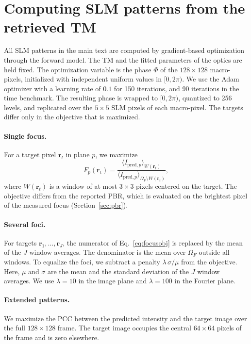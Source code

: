 \documentclass{article}
\begin{document}
\section{Computing SLM patterns from the retrieved TM}
\label{sec:slm}
All SLM patterns in the main text are computed by gradient-based optimization through the forward model.
The TM and the fitted parameters of the optics are held fixed.
The optimization variable is the phase $\Phi$ of the $128\times128$ macro-pixels, initialized with independent uniform values in $[0,2\pi)$.
We use the Adam optimizer with a learning rate of $0.1$ for 150 iterations, and 90 iterations in the time benchmark.
The resulting phase is wrapped to $[0,2\pi)$, quantized to 256 levels, and replicated over the $5\times5$ SLM pixels of each macro-pixel.
The targets differ only in the objective that is maximized.

\paragraph{Single focus.}
For a target pixel $\mathbf{r}_t$ in plane $p$, we maximize
\begin{equation}
\label{eq:focusobj}
F_p(\mathbf{r}_t)=\frac{\langle I_{\mathrm{pred},p}\rangle_{W(\mathbf{r}_t)}}{\langle I_{\mathrm{pred},p}\rangle_{\Omega_F\setminus W(\mathbf{r}_t)}},
\end{equation}
where $W(\mathbf{r}_t)$ is a window of at most $3\times3$ pixels centered on the target.
The objective differs from the reported PBR, which is evaluated on the brightest pixel of the measured focus (Section~\ref{sec:pbr}).

\paragraph{Several foci.}
For targets $\mathbf{r}_1,\dots,\mathbf{r}_J$, the numerator of Eq.~\eqref{eq:focusobj} is replaced by the mean of the $J$ window averages.
The denominator is the mean over $\Omega_F$ outside all windows.
To equalize the foci, we subtract a penalty $\lambda\,\sigma/\mu$ from the objective.
Here, $\mu$ and $\sigma$ are the mean and the standard deviation of the $J$ window averages.
We use $\lambda=10$ in the image plane and $\lambda=100$ in the Fourier plane.

\paragraph{Extended patterns.}
We maximize the PCC between the predicted intensity and the target image over the full $128\times128$ frame.
The target image occupies the central $64\times64$ pixels of the frame and is zero elsewhere.
\end{document}
